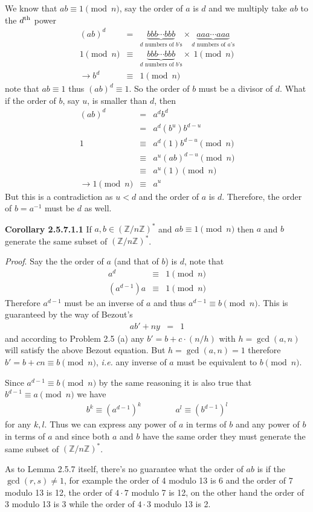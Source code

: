 \documentclass[aps,preprint,preprintnumbers,nofootinbib,showpacs,prd]{revtex4-1}
\newcommand{\ie}{{\it i.e.} }
\newcommand{\nbea}{\begin{eqnarray*}}
\newcommand{\neea}{\end{eqnarray*}}
\begin{document}
We know that $ab \equiv 1 \pmod{n}$, say the order of $a$ is $d$ and we multiply take $ab$ to the $d^{\rm th}$ power
%
\nbea
(ab)^d & = & \underbrace{bbb \cdots bbb}_\text{$d$ numbers of $b$'s} \times \underbrace{aaa \cdots aaa}_\text{$d$ numbers of $a$'s} \\
1 \pmod{n} & \equiv & \underbrace{bbb \cdots bbb}_\text{$d$ numbers of $b$'s} \times ~ 1 \pmod{n} \\
\to b^d & \equiv & 1 \pmod{n}
\neea
%
note that $ab \equiv 1$ thus $(ab)^d \equiv 1$. So the order of $b$ must be a divisor of $d$. What if the order of $b$, say $u$, is smaller than $d$, then
%
\nbea
(ab)^d & = & a^d b^d \\
& = & a^d (b^u) b^{d-u} \\
1 & \equiv & a^d (1) b^{d-u} \pmod{n} \\
& \equiv &  a^u (ab)^{d-u} \pmod{n} \\
& \equiv &  a^u (1) \pmod{n} \\
\to 1 \pmod{n} & \equiv & a^u
\neea
%
But this is a contradiction as $u < d$ and the order of $a$ is $d$. Therefore, the order of $b = a^{-1}$ must be $d$ as well.

{\bf Corollary 2.5.7.1.1} If $a, b \in (\mathbb{Z}/n\mathbb{Z})^*$ and $ab \equiv 1 \pmod{n}$ then $a$ and $b$ generate the same subset of $(\mathbb{Z}/n\mathbb{Z})^*$.

{\it Proof}. Say the the order of $a$ (and that of $b$) is $d$, note that
%
\nbea
a^d & \equiv & 1 \pmod{n} \\
(a^{d-1}) a & \equiv & 1 \pmod{n}
\neea
%
Therefore $a^{d-1}$ must be an inverse of $a$ and thus $a^{d-1} \equiv b \pmod{n}$. This is guaranteed by the way of Bezout's
%
\nbea
ab' + ny & = & 1
\neea
%
and according to Problem 2.5 (a) any $b' = b + c \cdot (n/h)$ with $h = \gcd(a,n)$ will satisfy the above Bezout equation. But $h = \gcd(a,n) = 1$ therefore $b' = b + cn \equiv b \pmod{n}$, \ie any inverse of $a$ must be equivalent to $b \pmod{n}$.

Since $a^{d-1} \equiv b \pmod{n}$ by the same reasoning it is also true that $b^{d-1} \equiv a \pmod{n}$ we have
%
\nbea
b^k \equiv (a^{d-1})^k & ~~~~~~~~~~~ & a^l \equiv (b^{d-1})^l
\neea
%
for any $k, l$. Thus we can express any power of $a$ in terms of $b$ and any power of $b$ in terms of $a$ and since both $a$ and $b$ have the same order they must generate the same subset of $(\mathbb{Z}/n\mathbb{Z})^*$.
 
As to Lemma 2.5.7 itself, there's no guarantee what the order of $ab$ is if the $\gcd(r,s) \neq 1$, for example the order of 4 modulo 13 is 6 and the order of 7 modulo 13 is 12, the order of $4\cdot 7$ modulo 7 is 12, on the other hand the order of 3 modulo 13 is 3 while the order of $4 \cdot 3$ modulo 13 is 2.
\end{document}
